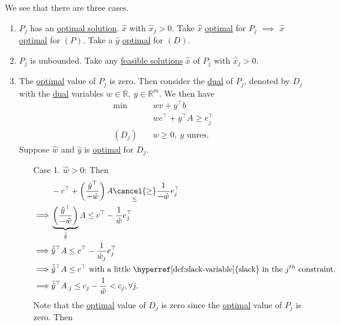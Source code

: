 \begin{explanation}
	We see that there are three cases.
	\begin{enumerate}
		\item \(P_{j}\) has an \hyperref[def:optimal-solution]{optimal solution}. \(\hat{x}\) with \(\hat{x}_j>0\). Take \(\hat{x}\) \hyperref[def:optimal-solution]{optimal}
		      for \(P_{j}\) \(\implies\) \(\hat{x}\) \hyperref[def:optimal-solution]{optimal} for \((P)\). Take a \(\hat{y}\) \hyperref[def:optimal-solution]{optimal} for \((D)\).
		\item \(P_{j}\) is unbounded. Take any \hyperref[def:feasible-solution]{feasible solutions} \(\hat{x}\) of \(P_{j}\) with \(\hat{x}_j>0\).
		\item The \hyperref[def:optimal-solution]{optimal} value of \(P_{j}\) is zero. Then consider the \hyperref[def:dual]{dual} of \(P_{j}\),
		      denoted by \(D_{j}\) with the \hyperref[def:dual]{dual} variables \(w\in\mathbb{R},\ y\in\mathbb{R}^m\).
		      We then have
		      \[
			      \begin{aligned}
				      \min~        & wv + y^{\top}b                        \\
				                   & wc^{\top}+y^{\top}A \geq e_{j}^{\top} \\
				      (D_{j})\quad & w\geq 0,\ y \text{ unres.}
			      \end{aligned}
		      \]
		      Suppose \(\hat{w}\) and \(\hat{y}\) is \hyperref[def:optimal-solution]{optimal} for \(D_{j}\).
		      \begin{enumerate}
			      \item[Case 1.] \(\hat{w}>0\): Then
				      \[
					      \begin{split}
						      &-c^{\top} + \left( \frac{\hat{y}^{\top}}{-\hat{w}} \right)A\underset{\leq }{\cancel{\geq}} \frac{1}{-\hat{w}} e_{j}^{\top}\\
						      \implies&\underbrace{\left( \frac{\hat{y}^{\top}}{-\hat{w}} \right)}_{\hat{\hat{y}}} A\leq c^{\top} -  \frac{1}{\hat{w}} e_{j}^{\top}\\
						      \implies&\hat{\hat{y}}^{\top}A\leq c^{\top} - \frac{1}{\hat{w}_j}e_{j}^{\top}\\
						      \implies&\hat{\hat{y}}^{\top}A\leq c^{\top} \text{ with a little \hyperref[def:slack-variable]{slack} in the \(j^{th}\) constraint.}\\
						      \implies&\hat{\hat{y}}^{\top}A_{\cdot j}\leq c_{j} - \frac{1}{\hat{w}}<c_{j}, \forall j.
					      \end{split}
				      \]
				      Note that the \hyperref[def:optimal-solution]{optimal} value of \(D_{j}\) is zero since the \hyperref[def:optimal-solution]{optimal} value of \(P_{j}\) is zero. Then

\end{enumerate}
\end{enumerate}
\end{explanation}
